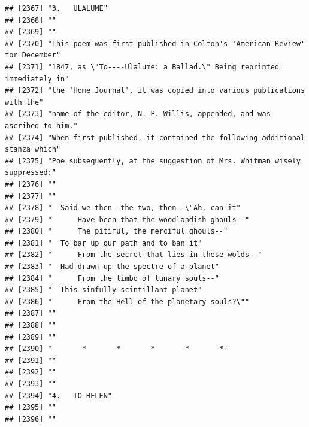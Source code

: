 \documentclass{article}\usepackage[]{graphicx}\usepackage[]{color}
\makeatletter
\newenvironment{kframe}{%
 \def\at@end@of@kframe{}%
 \ifinner\ifhmode%
  \def\at@end@of@kframe{\end{minipage}}%
  \begin{minipage}{\columnwidth}%
 \fi\fi%
 \def\FrameCommand##1{\hskip\@totalleftmargin \hskip-\fboxsep
 \colorbox{shadecolor}{##1}\hskip-\fboxsep
     \hskip-\linewidth \hskip-\@totalleftmargin \hskip\columnwidth}%
 \MakeFramed {\advance\hsize-\width
   \@totalleftmargin\z@ \linewidth\hsize
   \@setminipage}}%
 {\par\unskip\endMakeFramed%
 \at@end@of@kframe}
\newenvironment{knitrout}{}{} %
\makeatother
\begin{document}
\begin{knitrout}
\begin{kframe}
\begin{verbatim}
## [2367] "3.   ULALUME"                                                                
## [2368] ""                                                                            
## [2369] ""                                                                            
## [2370] "This poem was first published in Colton's 'American Review' for December"    
## [2371] "1847, as \"To----Ulalume: a Ballad.\" Being reprinted immediately in"        
## [2372] "the 'Home Journal', it was copied into various publications with the"        
## [2373] "name of the editor, N. P. Willis, appended, and was ascribed to him."        
## [2374] "When first published, it contained the following additional stanza which"    
## [2375] "Poe subsequently, at the suggestion of Mrs. Whitman wisely suppressed:"      
## [2376] ""                                                                            
## [2377] ""                                                                            
## [2378] "  Said we then--the two, then--\"Ah, can it"                                 
## [2379] "      Have been that the woodlandish ghouls--"                               
## [2380] "      The pitiful, the merciful ghouls--"                                    
## [2381] "  To bar up our path and to ban it"                                          
## [2382] "      From the secret that lies in these wolds--"                            
## [2383] "  Had drawn up the spectre of a planet"                                      
## [2384] "      From the limbo of lunary souls--"                                      
## [2385] "  This sinfully scintillant planet"                                          
## [2386] "      From the Hell of the planetary souls?\""                               
## [2387] ""                                                                            
## [2388] ""                                                                            
## [2389] ""                                                                            
## [2390] "       *       *       *       *       *"                                    
## [2391] ""                                                                            
## [2392] ""                                                                            
## [2393] ""                                                                            
## [2394] "4.   TO HELEN"                                                               
## [2395] ""                                                                            
## [2396] ""                                                                            

\end{verbatim}
\end{kframe}
\end{knitrout}
\end{document}
